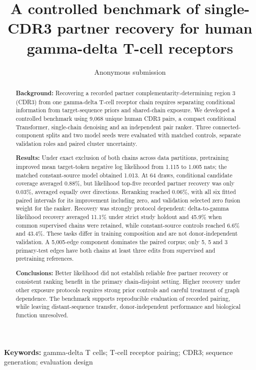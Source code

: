 \documentclass[10pt]{article}
\title{A controlled benchmark of single-CDR3 partner recovery for human gamma-delta T-cell receptors}
\author{Anonymous submission}
\date{}
\begin{document}
\maketitle

\begin{abstract}
\textbf{Background:} Recovering a recorded partner complementarity-determining
region 3 (CDR3) from one gamma-delta T-cell receptor chain requires separating
conditional information from target-sequence priors and shared-chain exposure.
We developed a controlled benchmark using 9,068 unique human CDR3 pairs, a
compact conditional Transformer, single-chain denoising and an independent
pair ranker. Three connected-component splits and two model seeds were evaluated
with matched controls, separate validation roles and paired cluster uncertainty.

\textbf{Results:} Under exact exclusion of both chains across data partitions,
pretraining improved mean target-token negative log likelihood from 1.115 to
1.005 nats; the matched constant-source model obtained 1.013. At 64 draws,
conditional candidate coverage averaged 0.88\%, but likelihood top-five recorded
partner recovery was only 0.03\%, averaged equally over directions. Reranking
reached 0.06\%, with all six fitted paired intervals for its improvement including
zero, and validation selected zero fusion weight for the ranker. Recovery was
strongly protocol dependent: delta-to-gamma likelihood recovery averaged 11.1\%
under strict study holdout and 45.9\% when common supervised chains were retained,
while constant-source controls reached 6.6\% and 43.4\%. These tasks differ in
training composition and are not donor-independent validation. A 5,005-edge
component dominates the paired corpus; only 5, 5 and 3 primary-test edges have
both chains at least three edits from supervised and pretraining references.

\textbf{Conclusions:} Better likelihood did not establish reliable free partner
recovery or consistent ranking benefit in the primary chain-disjoint setting.
Higher recovery under other exposure protocols requires strong prior controls
and careful treatment of graph dependence. The benchmark supports reproducible
evaluation of recorded pairing, while leaving distant-sequence transfer,
donor-independent performance and biological function unresolved.
\end{abstract}
\noindent\textbf{Keywords:} gamma-delta T cells; T-cell receptor pairing; CDR3;
sequence generation; evaluation design
\end{document}
